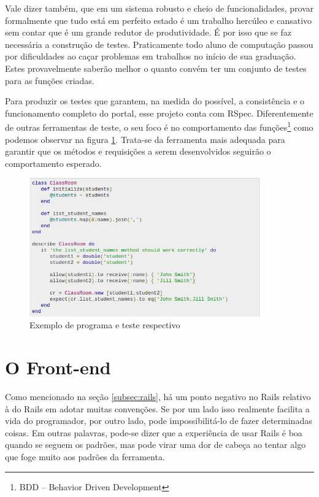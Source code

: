 Vale dizer também, que em um sistema robusto e cheio de funcionalidades, provar
formalmente que tudo está em perfeito estado é um trabalho hercúleo e cansativo
sem contar que é um grande redutor de produtividade. É por isso que se faz
necessária a construção de testes. Praticamente todo aluno de computação passou
por dificuldades ao caçar problemas em trabalhos no início de sua graduação.
Estes provavelmente saberão melhor o quanto convém ter um conjunto de testes
para as funções criadas.

Para produzir os testes que garantem, na medida do possível, a consistência e o
funcionamento completo do portal, esse projeto conta com RSpec. Diferentemente de
outras ferramentas de teste, o seu foco é no comportamento das funções\footnote{
BDD -- Behavior Driven Development} como podemos observar na figura \ref{fig:rspec}.
Trata-se da ferramenta mais adequada para garantir que os métodos e requisições a
serem desenvolvidos seguirão o comportamento esperado.

\begin{figure}[htb]
    \centering
    \includegraphics[width=10cm]{figuras/rspec}
    \caption{\label{fig:rspec} Exemplo de programa e teste respectivo}
\end{figure}

\section{O Front-end}
\label{sec:front-end}

Como mencionado na seção \ref{subsec:rails}, há um ponto negativo no Rails relativo à
 do Rails em adotar muitas convenções. Se por um lado isso realmente facilita
a vida do programador, por outro lado, pode impossibilitá-lo de fazer determinadas coisas.
Em outras palavras, pode-se dizer que a experiência de usar Rails é boa quando se seguem os 
padrões, mas pode virar uma dor de cabeça ao tentar algo que foge muito aos padrões da ferramenta.

